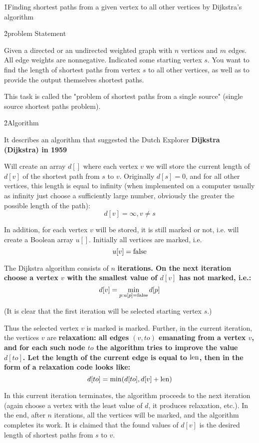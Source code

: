 \h1{Finding shortest paths from a given vertex to all other vertices by Dijkstra's algorithm}

\h2{problem Statement}

Given a directed or an undirected weighted graph with $n$ vertices and $m$ edges. All edge weights are nonnegative. Indicated some starting vertex $s$. You want to find the length of shortest paths from vertex $s$ to all other vertices, as well as to provide the output themselves shortest paths.

This task is called the "problem of shortest paths from a single source" (single source shortest paths problem).

\h2{Algorithm}

It describes an algorithm that suggested the Dutch Explorer \bf{Dijkstra} (Dijkstra) in 1959

Will create an array $d []$ where each vertex $v$ we will store the current length of $d[v]$ of the shortest path from $s$ to $v$. Originally $d[s]=0$, and for all other vertices, this length is equal to infinity (when implemented on a computer usually as infinity just choose a sufficiently large number, obviously the greater the possible length of the path):
$$ d[v] = \infty, v \ne s $$

In addition, for each vertex $v$ will be stored, it is still marked or not, i.e. will create a Boolean array $u[]$. Initially all vertices are marked, i.e.
$$ u[v] = {\rm false} $$

The Dijkstra algorithm consists of $n$ \bf{iterations}. On the next iteration choose a vertex $v$ with the smallest value of $d[v]$ has not marked, i.e.:
$$ d[v] = \min_{p: u[p]={\rm false}} d[p] $$

(It is clear that the first iteration will be selected starting vertex $s$.)

Thus the selected vertex $v$ is marked is marked. Further, in the current iteration, the vertices $v$ are \bf{relaxation}: all edges $(v,to)$ emanating from a vertex $v$, and for each such node $to$ the algorithm tries to improve the value $d[to]$. Let the length of the current edge is equal to $\rm len$, then in the form of a relaxation code looks like:
$$ d[to] = \min (d[to], d[v] + {\rm len}) $$

In this current iteration terminates, the algorithm proceeds to the next iteration (again choose a vertex with the least value of $d$, it produces relaxation, etc.). In the end, after $n$ iterations, all the vertices will be marked, and the algorithm completes its work. It is claimed that the found values of $d[v]$ is the desired length of shortest paths from $s$ to $v$.

